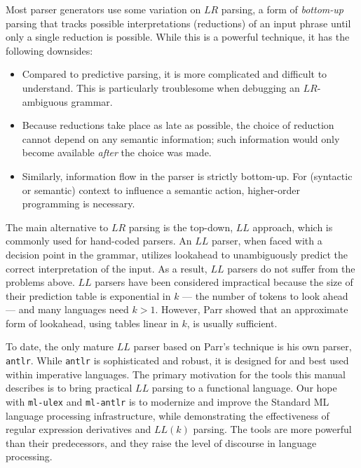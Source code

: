 Most parser generators use some variation on $LR$ parsing, a form of \emph{bottom-up} parsing that tracks possible interpretations (reductions) of an input phrase until only a single reduction is possible.  While this is a powerful technique, it has the following downsides:
\begin{itemize}
  \item Compared to predictive parsing, it is more complicated and difficult to understand.  This is particularly troublesome when debugging an $LR$-ambiguous grammar.
  \item Because reductions take place as late as possible, the choice of reduction cannot depend on any semantic information; such information would only become available \emph{after} the choice was made.
  \item Similarly, information flow in the parser is strictly bottom-up.  For (syntactic or semantic) context to influence a semantic action, higher-order programming is necessary.
\end{itemize} 
The main alternative to $LR$ parsing is the top-down, $LL$ approach, which is commonly used for hand-coded parsers.  An $LL$ parser, when faced with a decision point in the grammar, utilizes lookahead to unambiguously predict the correct interpretation of the input.  As a result, $LL$ parsers do not suffer from the problems above.  $LL$ parsers have been considered impractical because the size of their prediction table is exponential in $k$ --- the number of tokens to look ahead --- and many languages need $k > 1$.  However, Parr showed that an approximate form of lookahead, using tables linear in $k$, is usually sufficient.

To date, the only mature $LL$ parser based on Parr's technique is his own parser, {\tt antlr}.  While {\tt antlr} is sophisticated and robust, it is designed for and best used within imperative languages.  The primary motivation for the tools this manual describes is to bring practical $LL$ parsing to a functional language.
Our hope with {\tt ml-ulex} and {\tt ml-antlr} is to modernize and improve the Standard ML language processing infrastructure, while demonstrating the effectiveness of regular expression derivatives and $LL(k)$ parsing.  The tools are more powerful than their predecessors, and they raise the level of discourse in language processing.  


